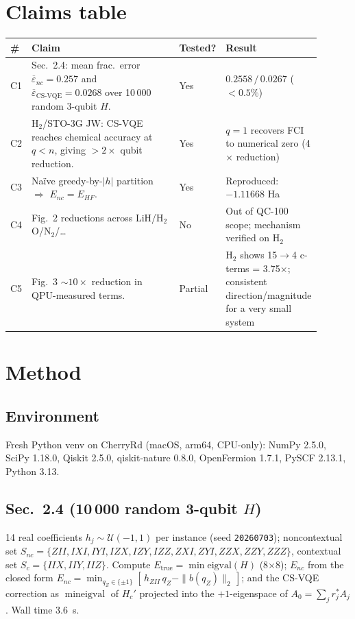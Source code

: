 \documentclass[11pt]{article}
\begin{document}
\section{Claims table}
\begin{longtable}{p{0.05\linewidth} p{0.55\linewidth} p{0.10\linewidth} p{0.20\linewidth}}
\toprule
\# & Claim & Tested? & Result \\
\midrule
C1 & Sec.~2.4: mean frac.\ error $\overline{\varepsilon}_{nc}=0.257$ and $\overline{\varepsilon}_{\text{CS-VQE}}=0.0268$ over 10\,000 random 3-qubit $H$. & Yes & $0.2558\,/\,0.0267$ ($<\!0.5\%$) \\
C2 & H$_2$/STO-3G JW: CS-VQE reaches chemical accuracy at $q < n$, giving $>\!2\times$ qubit reduction. & Yes & $q=1$ recovers FCI to numerical zero (4$\times$ reduction) \\
C3 & Naïve greedy-by-$|h|$ partition $\Rightarrow$ $E_{nc}=E_{HF}$. & Yes & Reproduced: $-1.11668$ Ha \\
C4 & Fig.~2 reductions across LiH/H$_2$O/N$_2$/\ldots & No & Out of QC-100 scope; mechanism verified on H$_2$ \\
C5 & Fig.~3 $\sim\!10\times$ reduction in QPU-measured terms. & Partial & H$_2$ shows 15$\to$4 c-terms = 3.75$\times$; consistent direction/magnitude for a very small system \\
\bottomrule
\end{longtable}

\section{Method}
\subsection{Environment}
Fresh Python venv on CherryRd (macOS, arm64, CPU-only):
NumPy 2.5.0, SciPy 1.18.0, Qiskit 2.5.0, qiskit-nature 0.8.0,
OpenFermion 1.7.1, PySCF 2.13.1, Python 3.13.

\subsection{Sec.~2.4 (10\,000 random 3-qubit $H$)}
14 real coefficients $h_j \sim \mathcal{U}(-1,1)$ per instance
(seed \texttt{20260703}); noncontextual set
$S_{nc}=\{ZII, IXI, IYI, IZX, IZY, IZZ, ZXI, ZYI, ZZX, ZZY, ZZZ\}$,
contextual set $S_c=\{IIX,IIY,IIZ\}$. Compute
$E_{\text{true}} = \min\text{eigval}(H)$ (8$\times$8);
$E_{nc}$ from the closed form
$E_{nc} = \min_{q_Z\in\{\pm1\}} [\,h_{ZII}\,q_Z - \|b(q_Z)\|_2\,]$;
and the CS-VQE correction as $\min\text{eigval}$ of $H_c'$ projected into
the $+1$-eigenspace of $A_0=\sum_j r_j^* A_j$. Wall time 3.6~s.
\end{document}
